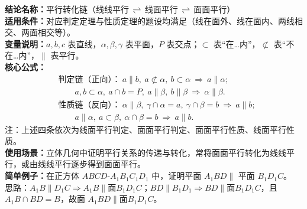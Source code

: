 \textbf{结论名称：}平行转化链（线线平行\,\(\rightleftharpoons\)\,线面平行\,\(\rightleftharpoons\)\,面面平行）\\
\textbf{适用条件：}对应判定定理与性质定理的题设均满足（线在面外、线在面内、两线相交、两面相交等）。\\
\textbf{变量说明：}\(a,b,c\) 表直线，\(\alpha,\beta,\gamma\) 表平面，\(P\) 表交点；\(\subset\) 表“在…内”，\(\not\subset\) 表“不在…内”，\(\parallel\) 表平行。\\
\textbf{核心公式：}
\[
\boxed{\begin{aligned}
&\textbf{判定链（正向）：}\ a\parallel b,\ a\not\subset\alpha,\ b\subset\alpha\ \Rightarrow\ a\parallel\alpha;\\
&\qquad a,b\subset\alpha,\ a\cap b=P,\ a\parallel\beta,\ b\parallel\beta\ \Rightarrow\ \alpha\parallel\beta.\\
&\textbf{性质链（反向）：}\ \alpha\parallel\beta,\ \gamma\cap\alpha=a,\ \gamma\cap\beta=b\ \Rightarrow\ a\parallel b;\\
&\qquad a\parallel\alpha,\ a\subset\beta,\ \alpha\cap\beta=b\ \Rightarrow\ a\parallel b.
\end{aligned}}
\]
注：上述四条依次为线面平行判定、面面平行判定、面面平行性质、线面平行性质。\\
\textbf{使用场景：}立体几何中证明平行关系的传递与转化，常将面面平行转化为线线平行，或由线线平行逐步得到面面平行。\\
\textbf{简单例子：}在正方体 \(ABCD\text{-}A_1B_1C_1D_1\) 中，证明平面 \(A_1BD\parallel\) 平面 \(B_1D_1C\)。\\
思路：\(A_1B\parallel D_1C\Rightarrow A_1B\parallel\text{面}B_1D_1C\)；\(BD\parallel B_1D_1\Rightarrow BD\parallel\text{面}B_1D_1C\)，且 \(A_1B\cap BD=B\)，故面 \(A_1BD\parallel\text{面}B_1D_1C\)。